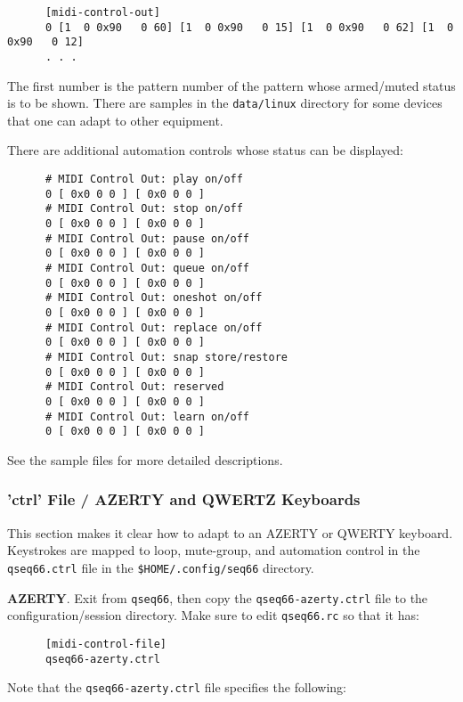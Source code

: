   \begin{verbatim}
      [midi-control-out]
      0 [1  0 0x90   0 60] [1  0 0x90   0 15] [1  0 0x90   0 62] [1  0 0x90   0 12]
      . . .
   \end{verbatim}

   The first number is the pattern number of the pattern whose armed/muted
   status is to be shown.
   There are samples in the \texttt{data/linux} directory for some devices that
   one can adapt to other equipment.

   There are additional automation controls whose status can be displayed:

   \begin{verbatim}
      # MIDI Control Out: play on/off
      0 [ 0x0 0 0 ] [ 0x0 0 0 ]
      # MIDI Control Out: stop on/off
      0 [ 0x0 0 0 ] [ 0x0 0 0 ]
      # MIDI Control Out: pause on/off
      0 [ 0x0 0 0 ] [ 0x0 0 0 ]
      # MIDI Control Out: queue on/off
      0 [ 0x0 0 0 ] [ 0x0 0 0 ]
      # MIDI Control Out: oneshot on/off
      0 [ 0x0 0 0 ] [ 0x0 0 0 ]
      # MIDI Control Out: replace on/off
      0 [ 0x0 0 0 ] [ 0x0 0 0 ]
      # MIDI Control Out: snap store/restore
      0 [ 0x0 0 0 ] [ 0x0 0 0 ]
      # MIDI Control Out: reserved
      0 [ 0x0 0 0 ] [ 0x0 0 0 ]
      # MIDI Control Out: learn on/off
      0 [ 0x0 0 0 ] [ 0x0 0 0 ]
   \end{verbatim}

   See the sample files for more detailed descriptions.

\subsubsection{'ctrl' File / AZERTY and QWERTZ Keyboards}
\label{subsubsec:configuration_ctrl_azerty}

   This section makes it clear how to adapt to an AZERTY or QWERTY keyboard.
   Keystrokes are mapped to loop, mute-group, and automation control in the
   \texttt{qseq66.ctrl} file in the \texttt{\$HOME/.config/seq66} directory.

   \textbf{AZERTY}.
   Exit from \texttt{qseq66}, then copy the \texttt{qseq66-azerty.ctrl}
   file to the configuration/session directory.
   Make sure to edit \texttt{qseq66.rc} so that it has:

   \begin{verbatim}
      [midi-control-file]
      qseq66-azerty.ctrl
   \end{verbatim}

   Note that the \texttt{qseq66-azerty.ctrl} file specifies the following:

